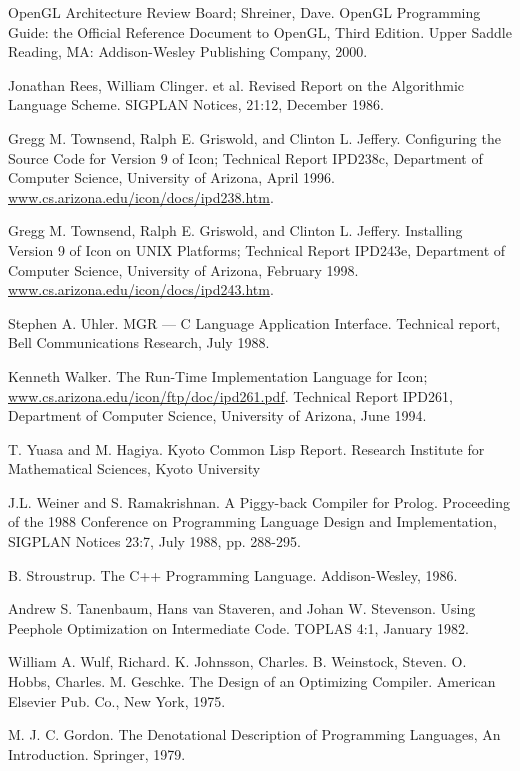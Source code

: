 \noindent
[OpenGL00] OpenGL Architecture Review Board; Shreiner, Dave. OpenGL
Programming Guide: the Official Reference Document to OpenGL, Third
Edition. Upper Saddle Reading, MA: Addison-Wesley Publishing Company,
2000.

\noindent
[Rees 86] Jonathan Rees, William Clinger. et al. Revised Report on the
Algorithmic Language Scheme. SIGPLAN Notices, 21:12, December 1986.

\noindent
[TGJ96] Gregg M. Townsend, Ralph E. Griswold, and Clinton
L. Jeffery. Configuring the Source Code for Version 9 of Icon;
Technical Report IPD238c, Department of Computer Science, University
of Arizona, April 1996.
\url{www.cs.arizona.edu/icon/docs/ipd238.htm}.

\noindent
[TGJ98] Gregg M. Townsend, Ralph E. Griswold, and Clinton
L. Jeffery. Installing Version 9 of Icon on UNIX Platforms; Technical
Report IPD243e, Department of Computer Science, University of Arizona,
February 1998.
\url{www.cs.arizona.edu/icon/docs/ipd243.htm}.

\noindent
[Uhl88] Stephen A. Uhler. MGR --- C Language Application
Interface. Technical report, Bell Communications Research, July 1988.

\noindent
[Walker94] Kenneth Walker. The Run-Time Implementation Language for Icon;
\url{www.cs.arizona.edu/icon/ftp/doc/ipd261.pdf}. Technical
Report IPD261, Department of Computer Science, University of Arizona,
June 1994.

\noindent
[Yuasa] T. Yuasa and M. Hagiya. Kyoto Common Lisp Report. Research
Institute for Mathematical Sciences, Kyoto University

\noindent
[Weiner] J.L. Weiner and S. Ramakrishnan. A Piggy-back Compiler for
Prolog. Proceeding of the 1988 Conference on Programming Language
Design and Implementation, SIGPLAN Notices 23:7, July 1988,
pp. 288-295.

\noindent
[Stroustrup 86] B. Stroustrup. The C++ Programming
Language. Addison-Wesley, 1986.

\noindent
[peephole] Andrew S. Tanenbaum, Hans van Staveren, and Johan
W. Stevenson. Using Peephole Optimization on Intermediate Code. TOPLAS
4:1, January 1982.

\noindent
[Wulf] William A. Wulf, Richard. K. Johnsson, Charles. B. Weinstock,
Steven. O. Hobbs, Charles. M. Geschke. The Design of an Optimizing
Compiler. American Elsevier Pub. Co., New York, 1975.

\noindent
[denote] M. J. C. Gordon. The Denotational Description of Programming
Languages, An Introduction. Springer, 1979.

